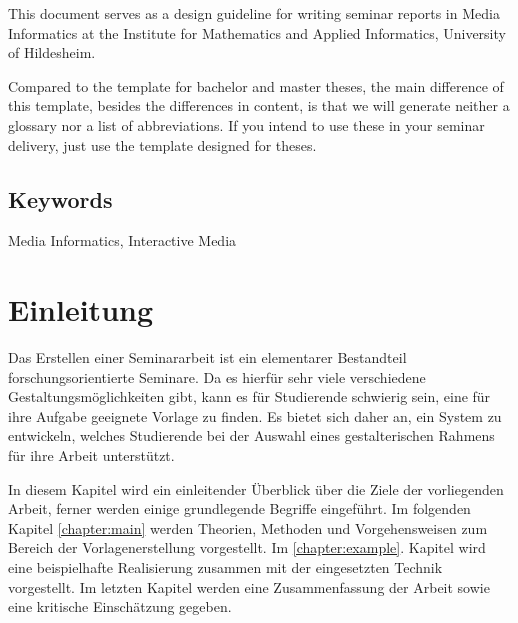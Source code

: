 \documentclass[12pt,        %
  english,ngerman,          %
  paper=a4,                 %
  captions=tablesignature,  %
  listof=numbered,          %
  bibliography=totoc,       %
  headings=small,           %
  headinclude=false,        %
  footinclude=false,        %
  parskip=half-,            %
  oneside,                  %
  DIV=12                    %
  ]{scrbook}                %
\begin{document}
  This document serves as a design guideline for writing seminar reports in
  Media Informatics at the Institute for Mathematics and Applied Informatics,
  University of Hildesheim.

  Compared to the template for bachelor and master theses, the main difference
  of this template, besides the differences in content, is that we will
  generate neither a glossary nor a list of abbreviations. If you intend to use
  these in your seminar delivery, just use the template designed for theses.

\vfill

\section*{Keywords} Media Informatics, Interactive Media

\clearpage
\setcounter{tocdepth}{1}
\tableofcontents

\mainmatter

\chapter{Einleitung}\label{chapter:introduction}


Das Erstellen einer Seminararbeit ist ein elementarer Bestandteil forschungsorientierte Seminare. Da es hierfür sehr viele verschiedene  Gestaltungsmöglichkeiten gibt, kann es für Studierende schwierig sein, eine für ihre Aufgabe geeignete Vorlage zu finden. Es bietet sich daher  an, ein System zu entwickeln, welches Studierende bei der Auswahl eines  gestalterischen Rahmens für ihre Arbeit unterstützt.

In diesem Kapitel wird ein einleitender Überblick über die Ziele der vorliegenden Arbeit, ferner werden einige grundlegende Begriffe eingeführt. Im folgenden Kapitel \ref{chapter:main} werden Theorien, Methoden und Vorgehensweisen zum Bereich der Vorlagenerstellung vorgestellt. Im \ref{chapter:example}. Kapitel wird eine beispielhafte Realisierung zusammen mit der eingesetzten Technik vorgestellt. Im letzten Kapitel werden eine Zusammenfassung der Arbeit sowie eine kritische Einschätzung gegeben.
\end{document}
